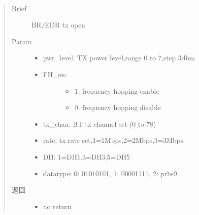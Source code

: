 \documentclass[letterpaper,10pt,english]{sphinxhowto}
\begin{document}
\begin{fulllineitems}
\begin{fulllineitems}
\begin{quote}
\begin{description}
\begin{itemize}
\end{itemize}


\end{description}\end{quote}

\end{fulllineitems}


\begin{fulllineitems}
\label{\detokenize{rfapi/index:bt_api.BTAPI.fcc_bt_tx}}~\begin{quote}\begin{description}
\item[{Brief}] \leavevmode
BR/EDR tx open

\item[{Param}] \leavevmode\begin{itemize}
\item {} 
pwr\_level: TX power level,range 0 to 7,step 3dbm

\item {} \begin{description}
\item[{FH\_en:}] \leavevmode\begin{itemize}
\item {} 
1: frequency hopping enable

\item {} 
0: frequency hopping disable

\end{itemize}

\end{description}

\item {} 
tx\_chan: BT tx channel set (0 to 78)

\item {} 
rate: tx rate set,1=1Mbps,2=2Mbps,3=3Mbps

\item {} 
DH: 1=DH1.3=DH3,5=DH5

\item {} 
datatype: 0: 01010101, 1: 00001111, 2: prbs9

\end{itemize}

\item[{返回}] \leavevmode
\begin{itemize}
\item {} 
no return


\end{itemize}
\end{description}
\end{quote}
\end{fulllineitems}
\end{fulllineitems}
\end{document}
